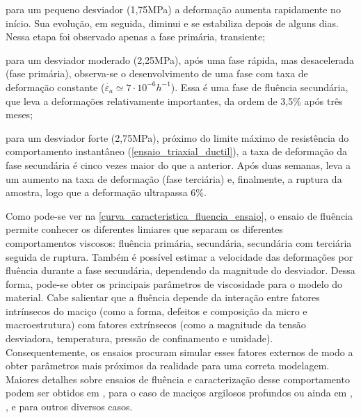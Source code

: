 \begin{alineas}
	
	\item para um pequeno desviador (1,75MPa) a deformação aumenta rapidamente no início. Sua evolução, em seguida, diminui e se estabiliza depois de alguns dias. Nessa etapa foi observado apenas a fase primária, transiente;
	
	\item para um desviador moderado (2,25MPa), após uma fase rápida, mas desacelerada (fase primária), observa-se o desenvolvimento de uma fase com taxa de deformação constante ($\dot{\varepsilon_a}\simeq 7\cdot {{10}^{-6}}{{h}^{-1}}$). Essa é uma fase de fluência secundária, que leva a deformações relativamente importantes, da ordem de 3,5\% após três meses;
	
	\item para um desviador forte (2,75MPa), próximo do limite máximo de resistência do comportamento instantâneo (\autoref{ensaio_triaxial_ductil}), a taxa de deformação da fase secundária é cinco vezes maior do que a anterior. Após duas semanas, leva a um aumento na taxa de deformação (fase terciária) e, finalmente, a ruptura da amostra, logo que a deformação ultrapassa 6\%.
	
\end{alineas}

Como pode-se ver na \autoref{curva_caracteristica_fluencia_ensaio}, o ensaio de fluência permite conhecer os diferentes limiares que separam os diferentes comportamentos viscosos: fluência primária, secundária, secundária com terciária seguida de ruptura. Também é possível estimar a velocidade das deformações por fluência durante a fase secundária, dependendo da magnitude do desviador. Dessa forma, pode-se obter os principais parâmetros de viscosidade para o modelo do material. Cabe salientar que a fluência depende da interação entre fatores intrínsecos do maciço (como a forma, defeitos e composição da micro e macroestrutura) com fatores extrínsecos (como a magnitude da tensão desviadora, temperatura, pressão de confinamento e umidade). Consequentemente, os ensaios procuram simular esses fatores externos de modo a obter parâmetros mais próximos da realidade para uma correta modelagem. Maiores detalhes sobre ensaios de fluência e caracterização desse comportamento podem ser obtidos em , para o caso de maciços argilosos profundos ou ainda em , ,  e  para outros diversos casos.

